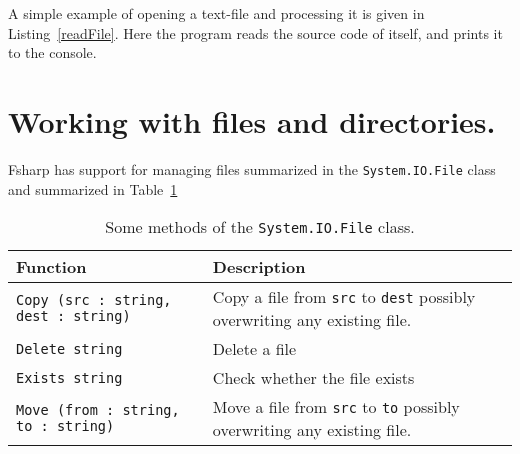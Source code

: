 A simple example of opening a text-file and processing it is given in Listing~\ref{readFile}.
%
%
Here the program reads the source code of itself, and prints it to the console.

\section{Working with files and directories.}
Fsharp has support for managing files summarized in the \lstinline!System.IO.File! class and summarized in Table~\ref{tab:File.Others}
\begin{table}
  \begin{center}
    \begin{tabularx}{\linewidth}{|l|X|}
      \hline
      \rowcolor{headerRowColor} Function & Description\\
      \hline
      \lstinline{Copy (src : string, dest : string)} & Copy a file from \lstinline{src} to \lstinline{dest} possibly overwriting any existing file.\\
      \hline
      \lstinline{Delete string} & Delete a file\\
      \hline
      \lstinline{Exists string} & Check whether the file exists\\
      \hline
      \lstinline{Move (from : string, to : string)} & Move a file from \lstinline{src} to \lstinline{to} possibly overwriting any existing file.\\
      \hline
    \end{tabularx}
  \end{center}
  \caption{Some methods of the \lstinline!System.IO.File! class.}
  \label{tab:File.Others}
\end{table}

